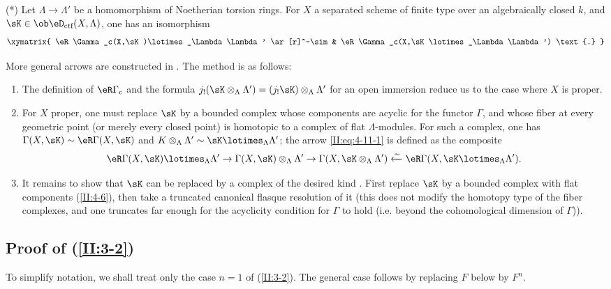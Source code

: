 \documentclass[oneside]{book}
\begin{document}
(*) Let $\Lambda\to\Lambda'$ be a homomorphism of Noetherian torsion rings.
For $X$ a separated scheme of finite type over an algebraically closed $k$,
and $\sK\in\ob\eD_\text{ctf}(X,\Lambda)$, one has an isomorphism
\[\xymatrix{
  \eR\Gamma_c(X,\sK)\lotimes_\Lambda \Lambda' \ar[r]^-\sim & \eR \Gamma_c(X,\sK\lotimes_\Lambda \Lambda') \text{.}
}\]

More general arrows are constructed in \cite[XVII 4.2.12]{sga4}. The method
is as follows:
\begin{enumerate}[\indent a)]
  \item The definition of $\eR\Gamma_c$ and the formula
    $j_!(\sK\otimes_\Lambda\Lambda') = (j_! \sK)\otimes_\Lambda\Lambda'$ for
    an open immersion reduce us to the case where $X$ is proper.
  \item For $X$ proper, one must replace $\sK$ by a bounded complex whose
    components are acyclic for the functor $\Gamma$, and whose fiber at every
    geometric point (or merely every closed point) is homotopic to a complex
    of flat $\Lambda$-modules. For such a complex, one has
    $\Gamma(X,\sK)\sim \eR\Gamma(X,\sK)$ and
    $K\otimes_\Lambda\Lambda'\sim \sK\lotimes_\Lambda\Lambda'$; the arrow
    \eqref{II:eq:4-11-1} is defined as the composite
    \[
      \eR\Gamma(X,\sK)\lotimes_\Lambda \Lambda' \to \Gamma(X,\sK)\otimes_\Lambda\Lambda' \to \Gamma(X,\sK\otimes_\Lambda\Lambda') \xleftarrow\sim \eR\Gamma(X,\sK\lotimes_\Lambda\Lambda') \text{.}
    \]
  \item It remains to show that $\sK$ can be replaced by a complex of the
    desired kind \cite[XVII.4.2.10]{sga4}. First replace $\sK$ by a bounded
    complex with flat components (\ref{II:4-6}), then take a truncated
    canonical flasque resolution of it (this does not modify the homotopy
    type of the fiber complexes, and one truncates far enough for the
    acyclicity condition for $\Gamma$ to hold (i.e. beyond the cohomological
    dimension of $\Gamma$)).
\end{enumerate}






\subsection{Proof of \texorpdfstring{(\ref{II:3-2})}{(3.2)}}\label{II:4-13}

To simplify notation, we shall treat only the case $n=1$ of
(\ref{II:3-2}). The general case follows by replacing $F$ below by $F^n$.
\end{document}

